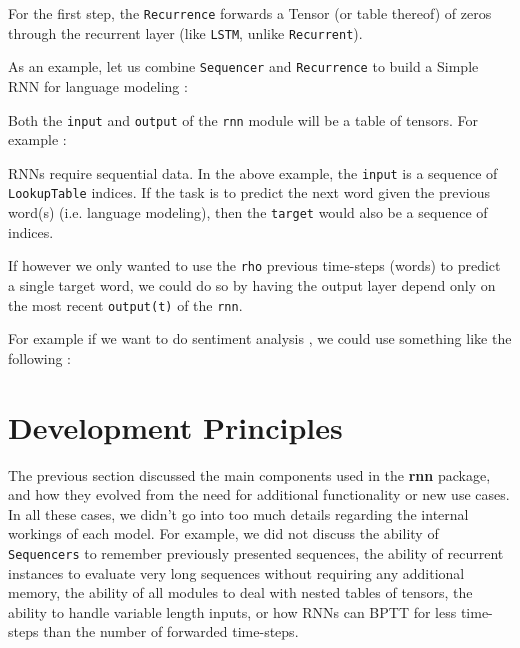 \documentclass{article} %
\providecommand{\inlinecode}[1]{\texttt{#1}}
\begin{document}
For the first step, the \inlinecode{Recurrence} forwards a Tensor (or table thereof) of zeros through 
the recurrent layer (like \inlinecode{LSTM}, unlike \inlinecode{Recurrent}).

As an example, let us combine \inlinecode{Sequencer} and \inlinecode{Recurrence} to build a Simple RNN for language modeling :



Both the \inlinecode{input} and \inlinecode{output} of the \inlinecode{rnn} module will 
be a table of tensors. For example :



RNNs require sequential data. In the above example, the \inlinecode{input} is a sequence 
of \inlinecode{LookupTable} indices. If the task is to predict the next word given 
the previous word(s) (i.e. language modeling), then the \inlinecode{target} would also be 
a sequence of indices.

If however we only wanted to use the \inlinecode{rho} previous time-steps (words) to predict 
a single target word, we could do so by having the output layer depend 
only on the most recent \inlinecode{output(t)} of the \inlinecode{rnn}. 

For example if we want to do sentiment analysis \cite{pang2008opinion}, 
we could use something like the following :



\section{Development Principles}

The previous section discussed the main components used in the \textbf{rnn} package, and how they 
evolved from the need for additional functionality or new use cases.
In all these cases, we didn't go into too much details regarding the internal workings of 
each model. For example, we did not discuss the ability of \inlinecode{Sequencers}
to remember previously presented sequences, the ability of recurrent
instances to evaluate very long sequences without requiring any additional memory,
the ability of all modules to deal with nested tables of tensors, the ability to handle variable 
length inputs, or how RNNs can BPTT for less time-steps than the number of forwarded time-steps.
\end{document}
